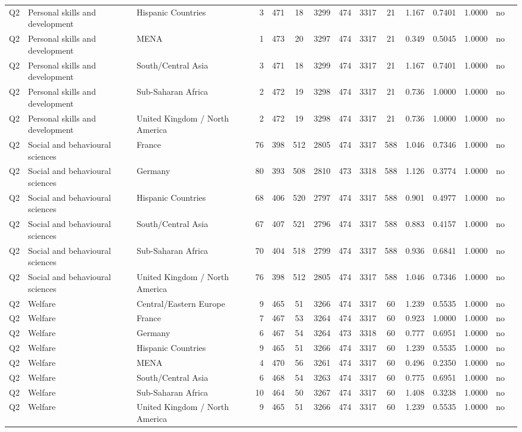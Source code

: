 \begin{longtable}{lllrcccccccccll}
Q2 & Personal skills and development & Hispanic Countries & 3 & 471 & 18 & 3299 & 474 & 3317 & 21 & 1.167 & 0.7401 & 1.0000 & no \\
Q2 & Personal skills and development & MENA & 1 & 473 & 20 & 3297 & 474 & 3317 & 21 & 0.349 & 0.5045 & 1.0000 & no \\
Q2 & Personal skills and development & South/Central Asia & 3 & 471 & 18 & 3299 & 474 & 3317 & 21 & 1.167 & 0.7401 & 1.0000 & no \\
Q2 & Personal skills and development & Sub-Saharan Africa & 2 & 472 & 19 & 3298 & 474 & 3317 & 21 & 0.736 & 1.0000 & 1.0000 & no \\
Q2 & Personal skills and development & United Kingdom / North America & 2 & 472 & 19 & 3298 & 474 & 3317 & 21 & 0.736 & 1.0000 & 1.0000 & no \\
Q2 & Social and behavioural sciences & France & 76 & 398 & 512 & 2805 & 474 & 3317 & 588 & 1.046 & 0.7346 & 1.0000 & no \\
Q2 & Social and behavioural sciences & Germany & 80 & 393 & 508 & 2810 & 473 & 3318 & 588 & 1.126 & 0.3774 & 1.0000 & no \\
Q2 & Social and behavioural sciences & Hispanic Countries & 68 & 406 & 520 & 2797 & 474 & 3317 & 588 & 0.901 & 0.4977 & 1.0000 & no \\
Q2 & Social and behavioural sciences & South/Central Asia & 67 & 407 & 521 & 2796 & 474 & 3317 & 588 & 0.883 & 0.4157 & 1.0000 & no \\
Q2 & Social and behavioural sciences & Sub-Saharan Africa & 70 & 404 & 518 & 2799 & 474 & 3317 & 588 & 0.936 & 0.6841 & 1.0000 & no \\
Q2 & Social and behavioural sciences & United Kingdom / North America & 76 & 398 & 512 & 2805 & 474 & 3317 & 588 & 1.046 & 0.7346 & 1.0000 & no \\
Q2 & Welfare & Central/Eastern Europe & 9 & 465 & 51 & 3266 & 474 & 3317 & 60 & 1.239 & 0.5535 & 1.0000 & no \\
Q2 & Welfare & France & 7 & 467 & 53 & 3264 & 474 & 3317 & 60 & 0.923 & 1.0000 & 1.0000 & no \\
Q2 & Welfare & Germany & 6 & 467 & 54 & 3264 & 473 & 3318 & 60 & 0.777 & 0.6951 & 1.0000 & no \\
Q2 & Welfare & Hispanic Countries & 9 & 465 & 51 & 3266 & 474 & 3317 & 60 & 1.239 & 0.5535 & 1.0000 & no \\
Q2 & Welfare & MENA & 4 & 470 & 56 & 3261 & 474 & 3317 & 60 & 0.496 & 0.2350 & 1.0000 & no \\
Q2 & Welfare & South/Central Asia & 6 & 468 & 54 & 3263 & 474 & 3317 & 60 & 0.775 & 0.6951 & 1.0000 & no \\
Q2 & Welfare & Sub-Saharan Africa & 10 & 464 & 50 & 3267 & 474 & 3317 & 60 & 1.408 & 0.3238 & 1.0000 & no \\
Q2 & Welfare & United Kingdom / North America & 9 & 465 & 51 & 3266 & 474 & 3317 & 60 & 1.239 & 0.5535 & 1.0000 & no \\
\end{longtable}
